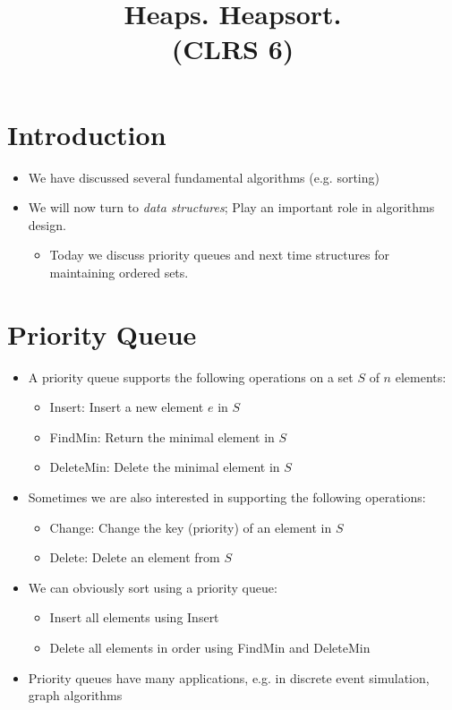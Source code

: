 \documentclass[11pt]{article}
\begin{document}
\title{{\bf Heaps. Heapsort.}\\
\normalsize{(CLRS 6)}}
\date{}

\maketitle


\section{Introduction}

\begin{itemize}
\item We have discussed several fundamental algorithms (e.g. sorting)
\item We will now turn to \emph{data structures}; Play an important role in
algorithms design.
        \begin{itemize}
        \item Today we discuss priority queues and next time
          structures for maintaining ordered sets.
        \end{itemize}
\end{itemize}

\section{Priority Queue}

\begin{itemize}
\item A priority queue supports the following operations on a set $S$ of
$n$ elements:
        \begin{itemize}
        \item {\sc Insert}: Insert a new element $e$ in $S$
        \item {\sc FindMin}: Return the minimal element in $S$
        \item {\sc DeleteMin}: Delete the minimal element in $S$
        \end{itemize}
\item Sometimes we are also interested in supporting the following
operations:
        \begin{itemize}
        \item {\sc Change}: Change the key (priority) of an element in $S$
        \item {\sc Delete}: Delete an element from $S$
        \end{itemize}
\item We can obviously sort using a priority queue:
        \begin{itemize}
        \item Insert all elements using {\sc Insert}
        \item Delete all elements in order using {\sc FindMin} and {\sc
        DeleteMin}
        \end{itemize}
\item Priority queues have many applications, e.g. in discrete event
simulation, graph algorithms
\end{itemize}
\end{document}
